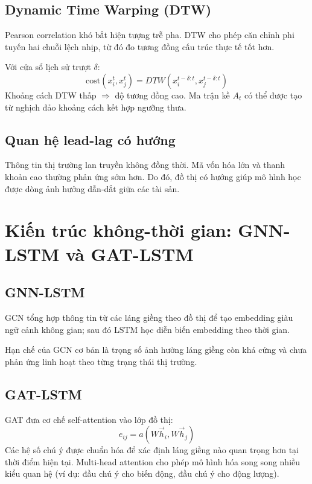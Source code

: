 \documentclass[12pt,a4paper]{article}
\begin{document}
\subsection{Dynamic Time Warping (DTW)}
Pearson correlation khó bắt hiện tượng trễ pha. DTW cho phép căn chỉnh phi tuyến hai chuỗi lệch nhịp, từ đó đo tương đồng cấu trúc thực tế tốt hơn.

Với cửa sổ lịch sử trượt $\delta$:
\begin{equation}
\text{cost}(x_i^t,x_j^t)=DTW\left(x_i^{t-\delta:t},x_j^{t-\delta:t}\right)
\end{equation}
Khoảng cách DTW thấp $\Rightarrow$ độ tương đồng cao. Ma trận kề $A_t$ có thể được tạo từ nghịch đảo khoảng cách kết hợp ngưỡng thưa.

\subsection{Quan hệ lead-lag có hướng}
Thông tin thị trường lan truyền không đồng thời. Mã vốn hóa lớn và thanh khoản cao thường phản ứng sớm hơn. Do đó, đồ thị có hướng giúp mô hình học được dòng ảnh hưởng dẫn-dắt giữa các tài sản.

\section{Kiến trúc không-thời gian: GNN-LSTM và GAT-LSTM}
\subsection{GNN-LSTM}
GCN tổng hợp thông tin từ các láng giềng theo đồ thị để tạo embedding giàu ngữ cảnh không gian; sau đó LSTM học diễn biến embedding theo thời gian.

Hạn chế của GCN cơ bản là trọng số ảnh hưởng láng giềng còn khá cứng và chưa phản ứng linh hoạt theo từng trạng thái thị trường.

\subsection{GAT-LSTM}
GAT đưa cơ chế self-attention vào lớp đồ thị:
\begin{equation}
e_{ij}=a\left(W\vec{h}_i, W\vec{h}_j\right)
\end{equation}
Các hệ số chú ý được chuẩn hóa để xác định láng giềng nào quan trọng hơn tại thời điểm hiện tại. Multi-head attention cho phép mô hình hóa song song nhiều kiểu quan hệ (ví dụ: đầu chú ý cho biến động, đầu chú ý cho động lượng).
\end{document}

